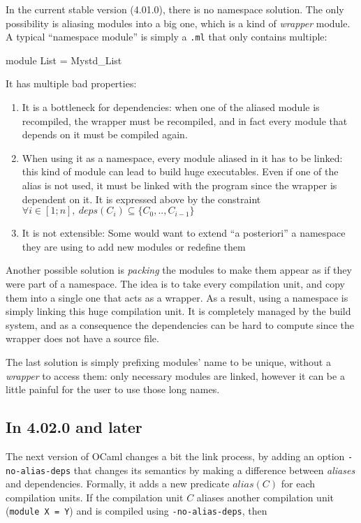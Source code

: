\documentclass[11pt,a4paper]{article}
\begin{document}
In the current stable version (4.01.0), there is no namespace solution. The only
possibility is aliasing modules into a big one, which is a kind of
\emph{wrapper} module. A typical ``namespace module'' is simply a \texttt{.ml}
that only contains multiple:

\begin{OCaml}
module List = Mystd_List
\end{OCaml}

It has multiple bad properties:
\begin{enumerate}
  \item It is a bottleneck for dependencies: when one of the aliased module is
    recompiled, the wrapper must be recompiled, and in fact every module that
    depends on it must be compiled again.
  \item When using it as a namespace, every module aliased in it has to be
    linked: this kind of module can lead to build huge executables. Even if one
    of the alias is not used, it must be linked with the program since the
    wrapper is dependent on it. It is expressed above by the constraint
    $ \forall i \in [1; n], ~deps(C_i) \subseteq \{ C_0, .., C_{i-1} \}$
  \item It is not extensible: Some would want to extend ``a posteriori'' a
    namespace they are using to add new modules or redefine them
\end{enumerate}

Another possible solution is \emph{packing} the modules to make them appear as
if they were part of a namespace. The idea is to take every compilation unit,
and copy them into a single one that acts as a wrapper. As a result, using a
namespace is simply linking this huge compilation unit. It is completely managed
by the build system, and as a consequence the dependencies can be hard to
compute since the wrapper does not have a source file.

The last solution is simply prefixing modules' name to be unique, without a
\emph{wrapper} to access them: only necessary modules are linked, however it can
be a little painful for the user to use those long names.

\subsection{In 4.02.0 and later}

The next version of OCaml changes a bit the link process, by adding an option
\texttt{-no-alias-deps} that changes its semantics by making a difference
between \emph{aliases} and dependencies. Formally, it adds a new predicate
$alias(C)$ for each compilation units. If the compilation unit $C$ aliases
another compilation unit (\texttt{module X = Y}) and is compiled using
\texttt{-no-alias-deps}, then
\end{document}
